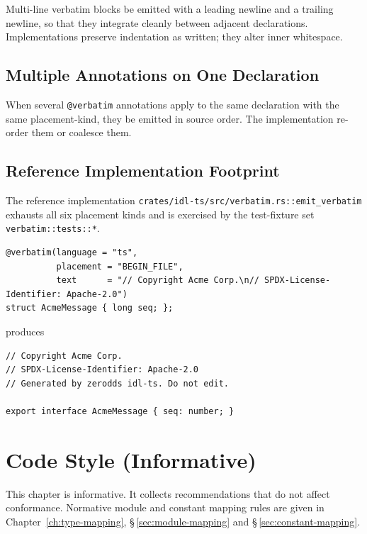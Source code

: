 \documentclass{../styles/zerodds-vendor-spec}
\begin{document}
Multi-line verbatim blocks  be emitted with a leading
newline and a trailing newline, so that they integrate cleanly
between adjacent declarations. Implementations 
preserve indentation as written; they  alter
inner whitespace.

\section{Multiple Annotations on One Declaration}

When several \texttt{@verbatim} annotations apply to the same
declaration with the same placement-kind, they  be
emitted in source order. The implementation 
re-order them or coalesce them.

\section{Reference Implementation Footprint}

The reference implementation
\texttt{crates/idl-ts/src/verbatim.rs::emit\_verbatim}
exhausts all six placement kinds and is exercised by the
test-fixture set \texttt{verbatim::tests::*}.

\begin{specexample}
\begin{lstlisting}
@verbatim(language = "ts",
          placement = "BEGIN_FILE",
          text      = "// Copyright Acme Corp.\n// SPDX-License-Identifier: Apache-2.0")
struct AcmeMessage { long seq; };
\end{lstlisting}
produces
\begin{lstlisting}
// Copyright Acme Corp.
// SPDX-License-Identifier: Apache-2.0
// Generated by zerodds idl-ts. Do not edit.

export interface AcmeMessage { seq: number; }
\end{lstlisting}
\end{specexample}

\chapter{Code Style (Informative)}\label{ch:code-style}

This chapter is informative. It collects recommendations that do
not affect conformance. Normative module and constant mapping
rules are given in
Chapter~\ref{ch:type-mapping},
\S\,\ref{sec:module-mapping} and \S\,\ref{sec:constant-mapping}.
\end{document}

